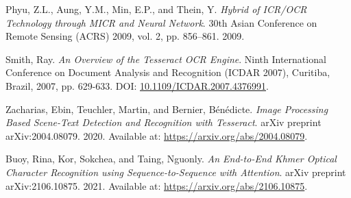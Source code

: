 \begin{thebibliography}{99}
Phyu, Z.L., Aung, Y.M., Min, E.P., and Thein, Y.
\textit{Hybrid of ICR/OCR Technology through MICR and Neural Network}.
30th Asian Conference on Remote Sensing (ACRS) 2009, vol. 2, pp. 856–861.
2009.


Smith, Ray.
\textit{An Overview of the Tesseract OCR Engine}.
Ninth International Conference on Document Analysis and Recognition (ICDAR 2007), Curitiba, Brazil, 2007, pp. 629-633.
DOI: \href{https://doi.org/10.1109/ICDAR.2007.4376991}{10.1109/ICDAR.2007.4376991}.

Zacharias, Ebin, Teuchler, Martin, and Bernier, Bénédicte.
\textit{Image Processing Based Scene-Text Detection and Recognition with Tesseract}.
arXiv preprint arXiv:2004.08079.
2020.
Available at: \href{https://arxiv.org/abs/2004.08079}{https://arxiv.org/abs/2004.08079}.

Buoy, Rina, Kor, Sokchea, and Taing, Nguonly.
\textit{An End-to-End Khmer Optical Character Recognition using Sequence-to-Sequence with Attention}.
arXiv preprint arXiv:2106.10875.
2021.
Available at: \href{https://arxiv.org/abs/2106.10875}{https://arxiv.org/abs/2106.10875}.



\end{thebibliography}